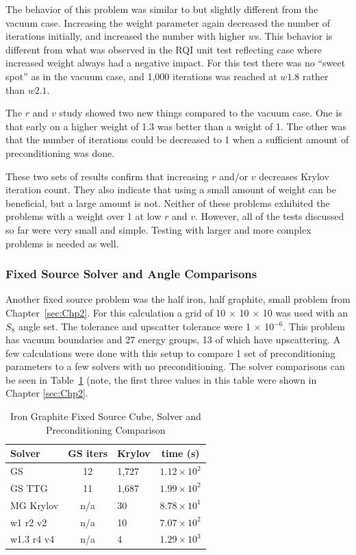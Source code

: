 The behavior of this problem was similar to but slightly different from the vacuum case. Increasing the weight parameter again decreased the number of iterations initially, and increased the number with higher $w$s. This behavior is different from what was observed in the RQI unit test reflecting case where increased weight always had a negative impact. For this test there was no ``sweet spot'' as in the vacuum case, and 1,000 iterations was reached at $w1.8$ rather than $w2.1$.

The $r$ and $v$ study showed two new things compared to the vacuum case. One is that early on a higher weight of 1.3 was better than a weight of 1. The other was that the number of iterations could be decreased to 1 when a sufficient amount of preconditioning was done. 

These two sets of results confirm that increasing $r$ and/or $v$ decreases Krylov iteration count. They also indicate that using a small amount of weight can be beneficial, but a large amount is not. Neither of these problems exhibited the problems with a weight over 1 at low $r$ and $v$. However, all of the tests discussed so far were very small and simple. Testing with larger and more complex problems is needed as well. 

\subsubsection{Fixed Source Solver and Angle Comparisons} 
Another fixed source problem was the half iron, half graphite, small problem from Chapter~\ref{sec:Chp2}. For this calculation a grid of 10 $\times$ 10 $\times$ 10 was used with an $S_{8}$ angle set. The tolerance and upscatter tolerance were 1 $\times$ 10$^{-6}$. This problem has vacuum boundaries and 27 energy groups, 13 of which have upscattering. A few calculations were done with this setup to compare 1 set of preconditioning parameters to a few solvers with no preconditioning. The solver comparisons can be seen in Table~\ref{table:FeC solvers} (note, the first three values in this table were shown in Chapter \ref{sec:Chp2}. 
%
\begin{table}[!h]
\caption{Iron Graphite Fixed Source Cube, Solver and Preconditioning Comparison}
\begin{center}
\begin{tabular}{l c l c}
\hline
Solver & GS iters & Krylov & time (s)\\[0.5ex]
\hline
GS &  12 & 1,727 & $1.12 \times 10^{2}$ \\
GS TTG & 11 & 1,687 & $1.99 \times 10^{2}$  \\
MG Krylov & n/a & 30 & $8.78 \times 10^{1}$ \\
w1 r2 v2 & n/a & 10 & $7.07 \times 10^{2}$ \\
w1.3 r4 v4 & n/a & 4 & $1.29 \times 10^{3}$ \\
\hline
\end{tabular}
\end{center}
\label{table:FeC solvers}
\end{table}


